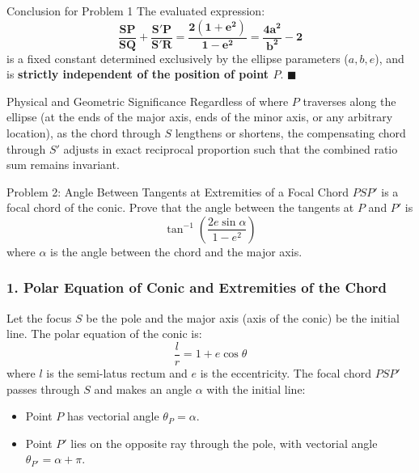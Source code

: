 \documentclass[11pt,a4paper]{article}
\begin{document}
\vspace{5mm}
\noindent
\begin{ansbox}{Conclusion for Problem 1}
The evaluated expression:
\[
\mathbf{\frac{SP}{SQ} + \frac{S'P}{S'R} = \frac{2(1 + e^2)}{1 - e^2} = \frac{4a^2}{b^2} - 2}
\]
is a fixed constant determined exclusively by the ellipse parameters ($a, b, e$), and is \textbf{strictly independent of the position of point $P$}. \hfill $\blacksquare$
\end{ansbox}

\vspace{5mm}
\begin{remarkbox}{Physical and Geometric Significance}
Regardless of where $P$ traverses along the ellipse (at the ends of the major axis, ends of the minor axis, or any arbitrary location), as the chord through $S$ lengthens or shortens, the compensating chord through $S'$ adjusts in exact reciprocal proportion such that the combined ratio sum remains invariant.
\end{remarkbox}

\clearpage
\noindent
\begin{problembox}{Problem 2: Angle Between Tangents at Extremities of a Focal Chord}
$PSP'$ is a focal chord of the conic. Prove that the angle between the tangents at $P$ and $P'$ is
\[
\tan^{-1}\left(\frac{2e\sin\alpha}{1 - e^2}\right)
\]
where $\alpha$ is the angle between the chord and the major axis.
\end{problembox}

\subsubsection*{1. Polar Equation of Conic and Extremities of the Chord}
Let the focus $S$ be the pole and the major axis (axis of the conic) be the initial line.
The polar equation of the conic is:
\[
\frac{l}{r} = 1 + e\cos\theta
\]
where $l$ is the semi-latus rectum and $e$ is the eccentricity.
The focal chord $PSP'$ passes through $S$ and makes an angle $\alpha$ with the initial line:
\begin{itemize}\setlength{\itemsep}{1pt}
    \item Point $P$ has vectorial angle $\theta_P = \alpha$.
    \item Point $P'$ lies on the opposite ray through the pole, with vectorial angle $\theta_{P'} = \alpha + \pi$.
\end{itemize}
\end{document}
